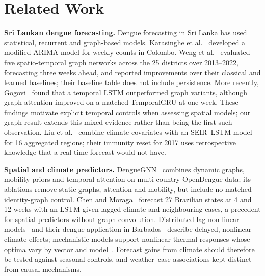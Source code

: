 \section{Related Work}

\textbf{Sri Lankan dengue forecasting.} Dengue forecasting in Sri Lanka has used statistical, recurrent and graph-based models. Karasinghe et al.~\cite{karasinghe2024weekly} developed a modified ARIMA model for weekly counts in Colombo. Weng et al.~\cite{weng2024graph} evaluated five spatio-temporal graph networks across the 25 districts over 2013--2022, forecasting three weeks ahead, and reported improvements over their classical and learned baselines; their baseline table does not include persistence. More recently, Gogovi~\cite{gogovi2026spatial} found that a temporal LSTM outperformed graph variants, although graph attention improved on a matched TemporalGRU at one week. These findings motivate explicit temporal controls when assessing spatial models; our graph result extends this mixed evidence rather than being the first such observation. Liu et al.~\cite{liu2025explainable} combine climate covariates with an SEIR--LSTM model for 16 aggregated regions; their immunity reset for 2017 uses retrospective knowledge that a real-time forecast would not have.

\textbf{Spatial and climate predictors.} DengueGNN~\cite{gulmohamed2026denguegnn} combines dynamic graphs, mobility priors and temporal attention on multi-country OpenDengue data; its ablations remove static graphs, attention and mobility, but include no matched identity-graph control. Chen and Moraga~\cite{chen2025climatespatial} forecast 27 Brazilian states at 4 and 12 weeks with an LSTM given lagged climate and neighbouring cases, a precedent for spatial predictors without graph convolution. Distributed lag non-linear models~\cite{gasparrini2010dlnm} and their dengue application in Barbados~\cite{lowe2018barbados} describe delayed, nonlinear climate effects; mechanistic models support nonlinear thermal responses whose optima vary by vector and model~\cite{mordecai2017temperature}. Forecast gains from climate should therefore be tested against seasonal controls, and weather--case associations kept distinct from causal mechanisms.

